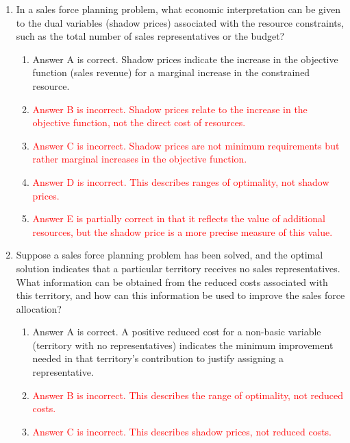 \documentclass{article}%
\newcommand{\incorrect}[1]{\textcolor{red}{#1}}
\begin{document}
\begin{enumerate}
\begin{enumerate}
\item \incorrect{Answer E is partially correct in that some problems might include sales targets, but the primary resource constraints are usually on the total number of representatives and the budget.}%
\end{enumerate}%
\vspace{1em}%
\item In a sales force planning problem, what economic interpretation can be given to the dual variables (shadow prices) associated with the resource constraints, such as the total number of sales representatives or the budget?%
\begin{enumerate}%
\item Answer A is correct. Shadow prices indicate the increase in the objective function (sales revenue) for a marginal increase in the constrained resource.%
\item \incorrect{Answer B is incorrect. Shadow prices relate to the increase in the objective function, not the direct cost of resources.}%
\item \incorrect{Answer C is incorrect. Shadow prices are not minimum requirements but rather marginal increases in the objective function.}%
\item \incorrect{Answer D is incorrect.  This describes ranges of optimality, not shadow prices.}%
\item \incorrect{Answer E is partially correct in that it reflects the value of additional resources, but the shadow price is a more precise measure of this value.}%
\end{enumerate}%
\vspace{1em}%
\item Suppose a sales force planning problem has been solved, and the optimal solution indicates that a particular territory receives no sales representatives. What information can be obtained from the reduced costs associated with this territory, and how can this information be used to improve the sales force allocation?%
\begin{enumerate}%
\item Answer A is correct. A positive reduced cost for a non-basic variable (territory with no representatives) indicates the minimum improvement needed in that territory's contribution to justify assigning a representative.%
\item \incorrect{Answer B is incorrect. This describes the range of optimality, not reduced costs.}%
\item \incorrect{Answer C is incorrect. This describes shadow prices, not reduced costs.}%

\end{enumerate}
\end{enumerate}
\end{document}
